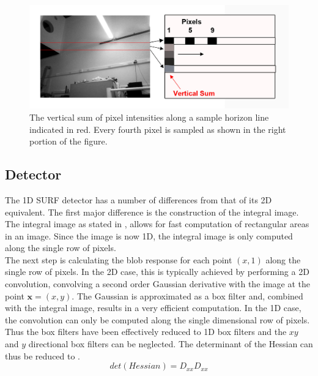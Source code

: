 \documentclass[11pt]{report}
\begin{document}
\begin{figure}[h!] 
  \centering
    \includegraphics[width=1.0\textwidth]{../Drawings/methods/horizon.jpg}
    \caption{The vertical sum of pixel intensities along a sample horizon line indicated in red. Every fourth pixel is sampled as shown in the right portion of the figure. }
    \label{fig:rows}
\end{figure}

\subsection{Detector}
\label{sec:1dsurfDetect}
The 1D SURF detector has a number of differences from that of its 2D equivalent. The first major difference is the construction of the integral image. The integral image as stated in , allows for fast computation of rectangular areas in an image. Since the image is now 1D, the integral image is only computed along the single row of pixels.\\ 

The next step is calculating the blob response for each point $(x,1)$ along the single row of pixels. In the 2D case, this is typically achieved by performing a 2D convolution, convolving a second order Gaussian derivative with the image at the point $\textbf{x} = (x,y)$. The Gaussian is approximated as a box filter and, combined with the integral image, results in a very efficient computation. In the 1D case, the convolution can only be computed along the single dimensional row of pixels. Thus the box filters have been effectively reduced to 1D box filters and the $xy$ and $y$ directional box filters can be neglected. The determinant of the Hessian can thus be reduced to .\\

\begin{equation}
det(Hessian) = D_{xx}D_{xx}
\label{eqn:reducedHessian}
\end{equation} 
\end{document}
